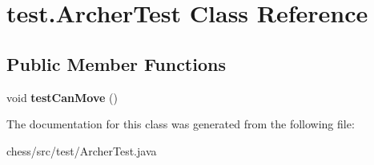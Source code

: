 \hypertarget{classtest_1_1_archer_test}{}\section{test.\+Archer\+Test Class Reference}
\label{classtest_1_1_archer_test}
\subsection*{Public Member Functions}
\begin{DoxyCompactItemize}
\item 
\mbox{\label{classtest_1_1_archer_test_a212f3caaa4a01af21c0ded6046f1b80b}} 
void {\bfseries test\+Can\+Move} ()
\end{DoxyCompactItemize}


The documentation for this class was generated from the following file\+:\begin{DoxyCompactItemize}
\item 
chess/src/test/Archer\+Test.\+java\end{DoxyCompactItemize}
